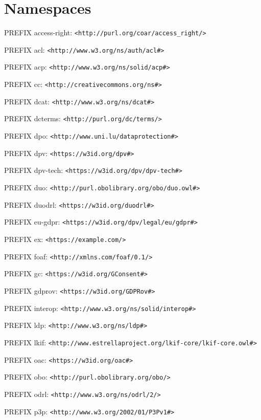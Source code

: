 \section*{Namespaces}
\label{sec::namespaces}

\vspace{10 mm}

PREFIX access-right: \texttt{<http://purl.org/coar/access\_right/>}

PREFIX acl: \texttt{<http://www.w3.org/ns/auth/acl\#>}

PREFIX acp: \texttt{<http://www.w3.org/ns/solid/acp\#>}

PREFIX cc: \texttt{<http://creativecommons.org/ns\#>}

PREFIX dcat: \texttt{<http://www.w3.org/ns/dcat\#>}

PREFIX dcterms: \texttt{<http://purl.org/dc/terms/>}

PREFIX dpo: \texttt{<http://www.uni.lu/dataprotection\#>}

PREFIX dpv: \texttt{<https://w3id.org/dpv\#>}

PREFIX dpv-tech: \texttt{<https://w3id.org/dpv/dpv-tech\#>}

PREFIX duo: \texttt{<http://purl.obolibrary.org/obo/duo.owl\#>}

PREFIX duodrl: \texttt{<https://w3id.org/duodrl\#>}

PREFIX eu-gdpr: \texttt{<https://w3id.org/dpv/legal/eu/gdpr\#>}

PREFIX ex: \texttt{<https://example.com/>}

PREFIX foaf: \texttt{<http://xmlns.com/foaf/0.1/>}

PREFIX gc: \texttt{<https://w3id.org/GConsent\#>}

PREFIX gdprov: \texttt{<https://w3id.org/GDPRov\#>}

PREFIX interop: \texttt{<http://www.w3.org/ns/solid/interop\#>}

PREFIX ldp: \texttt{<http://www.w3.org/ns/ldp\#>}

PREFIX lkif: \texttt{<http://www.estrellaproject.org/lkif-core/lkif-core.owl\#>} %

PREFIX oac: \texttt{<https://w3id.org/oac\#>}

PREFIX obo: \texttt{<http://purl.obolibrary.org/obo/>}

PREFIX odrl: \texttt{<http://www.w3.org/ns/odrl/2/>}

PREFIX p3p: \texttt{<http://www.w3.org/2002/01/P3Pv1\#>}

